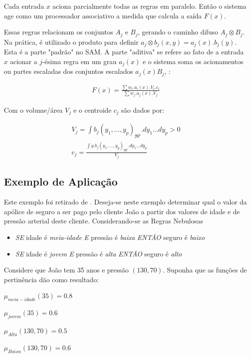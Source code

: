 Cada entrada $x$ aciona parcialmente todas as regras em paralelo. Então o sistema age como um processador 
associativo a medida que calcula a saída $F(x)$.

Essas regras relacionam os conjuntos $A_j$ e $B_j$, gerando o caminho difuso $A_j \otimes B_j$. Na prática,
é utilizado o produto para definir $ a_j \otimes b_j (x,y) = a_j(x).b_j(y)$. Esta é a parte "padrão" no SAM.
A parte "aditiva" se refere ao fato de a entrada $x$ acionar a $j$-ésima regra em um grau $a_j(x)$ e o sistema 
soma os acionamentos ou partes escaladas dos conjuntos escalados $a_j(x)B_j$, \cite{kosko1997fuzzy}:

\begin{eqnarray}
F(x) = \frac{\sum w_i.a_i(x).V_i.c_i}{\sum w_j.a_j(x).V_j}
\end{eqnarray}

Com o volume/área $V_j$ e o centroide $c_j$ são dados por:

\begin{eqnarray}
V_j = \int{b_j(y_1,...,y_p)}_{\Re^{p}}.dy_1...dy_p > 0\\
c_j = \frac{\int{y.b_j(y_1,...,y_p)}_{\Re^{p}}.dy_1...dy_p}{V_j}
\end{eqnarray}

\subsection{Exemplo de Aplicação}
 Este exemplo foi retirado de \cite{passos2005datamining}. Deseja-se neste
 exemplo determinar qual o valor da apólice de seguro a ser pago pelo
 cliente João a partir dos valores de idade e de pressão arterial deste cliente.
 Considerando-se as Regras Nebulosas
 \begin{itemize}
   \item \emph{SE} idade é \textit{meia-idade} \emph{E} pressão é \textit{baixa} \emph{ENTÂO} seguro é \textit{baixo}
   \item \emph{SE} idade é \textit{jovem} \emph{E} pressão é \textit{alta} \emph{ENTÂO} seguro é \textit{alto}
 \end{itemize}
 
 Considere que João tem 35 anos e pressão $(130,70)$. Suponha que as funções de pertinência dão como resultado:
 \begin{description}
   \item $\mu_{meia-idade} (35) = 0.8$
   \item $\mu_{jovem} (35) = 0.6$
   \item $\mu_{Alta}(130,70) = 0.5$
   \item $\mu_{Baixa}(130,70) = 0.6$
 \end{description}
 
